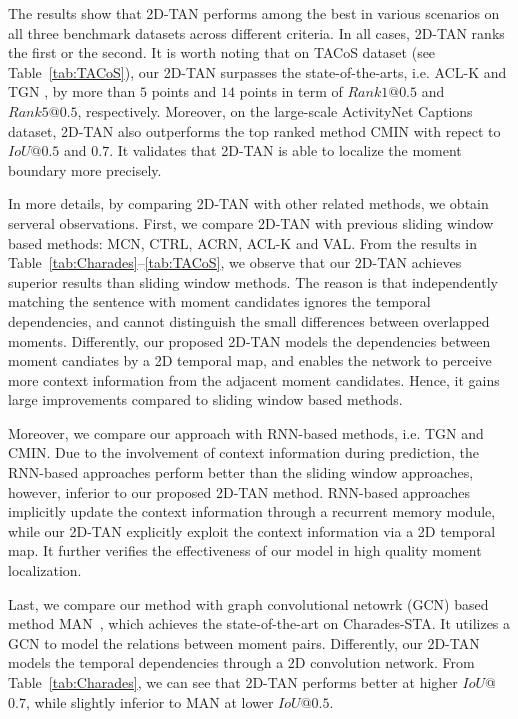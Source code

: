\documentclass[letterpaper]{article} %
\begin{document}
The results show that 2D-TAN performs among the best in various scenarios on all three benchmark datasets across different criteria. In all cases, 2D-TAN ranks the first or the second. It is worth noting that on TACoS dataset (see Table~\ref{tab:TACoS}), our 2D-TAN surpasses the state-of-the-arts, i.e. ACL-K %
and TGN%
, by more than $5$ points and $14$ points in term of $Rank1@0.5$ and $Rank5@0.5$, respectively. Moreover, on the large-scale ActivityNet Captions dataset, 2D-TAN also outperforms the top ranked method CMIN with repect to $IoU@0.5$ and $0.7$. It validates that 2D-TAN is able to localize the moment boundary more precisely.


In more details, by comparing 2D-TAN with other related methods, we obtain serveral observations.
First, we compare 2D-TAN with previous sliding window based methods: MCN, CTRL, ACRN, ACL-K and VAL.
From the results in Table~\ref{tab:Charades}--\ref{tab:TACoS}, we observe that
our 2D-TAN achieves superior results than sliding window methods. The reason is that independently matching the sentence with moment candidates ignores the temporal dependencies, and cannot distinguish the small differences between overlapped moments.
Differently, our proposed 2D-TAN models the dependencies between moment candiates by a 2D temporal map, and enables the network to perceive more context information from the adjacent moment candidates. Hence, it gains large improvements compared to sliding window based methods.

Moreover, we compare our approach with RNN-based methods, i.e. TGN and CMIN.
Due to the involvement of context information during prediction, the RNN-based approaches perform better than the sliding window approaches, however, inferior to our proposed 2D-TAN method.
RNN-based approaches implicitly update the context information through a recurrent memory module, while our 2D-TAN explicitly exploit the context information via a 2D temporal map.
It further verifies the effectiveness of our model in high quality moment localization.

Last, we compare our method with graph convolutional netowrk (GCN) based method MAN~\cite{zhang2019man}, which achieves the state-of-the-art on Charades-STA. It utilizes a GCN to model the relations between moment pairs. Differently, our 2D-TAN models the temporal dependencies through a 2D convolution network.
From Table~\ref{tab:Charades}, we can see that 2D-TAN performs better at higher $IoU$@$0.7$, while slightly inferior to MAN at lower $IoU$@$0.5$.
\end{document}

